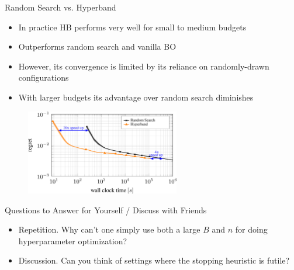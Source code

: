\begin{frame}{Random Search vs. Hyperband}

\begin{itemize}
    \item In practice HB performs very well for small to medium budgets
    \item Outperforms random search and vanilla BO
    \item However, its convergence is limited by its reliance on randomly-drawn configurations
    \item With larger budgets its advantage over random search diminishes
\end{itemize}
\begin{figure}
    \centering
    \includegraphics[width=0.6\textwidth]{w07_hpo_grey_box/images/hyperband/comparison_rs_hb.png}
\end{figure}


\end{frame}


\begin{frame}{Questions to Answer for Yourself / Discuss with Friends}

\bigskip

\begin{itemize}
    \item \alert{Repetition.} Why can't one simply use both a large $B$ and $n$ for doing hyperparameter optimization?

\medskip
    \item \alert{Discussion.} 
    Can you think of settings where the stopping heuristic is futile?

\end{itemize}

\end{frame}
